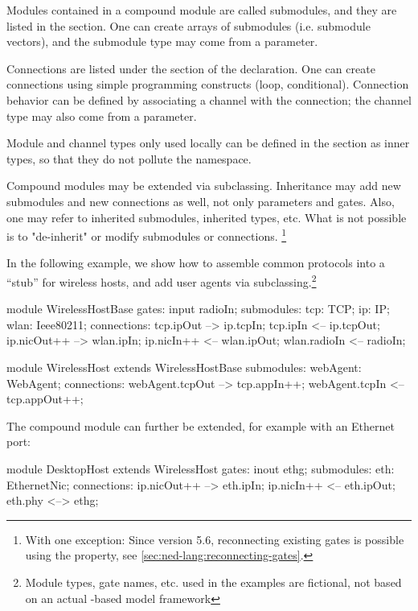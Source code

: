 Modules contained in a compound module are called submodules, and they are
listed in the  section. One can create arrays of submodules
(i.e. submodule vectors), and the submodule type may come from a parameter.

Connections are listed under the  section of the
declaration. One can create connections using simple programming constructs
(loop, conditional). Connection behavior can be defined by associating a
channel with the connection; the channel type may also come from a
parameter.

Module and channel types only used locally can be defined in the
 section as inner types, so that they do not pollute the
namespace.

Compound modules may be extended via subclassing. Inheritance may add new
submodules and new connections as well, not only parameters and gates.
Also, one may refer to inherited submodules, inherited types, etc. What
is not possible is to "de-inherit" or modify submodules or connections.
\footnote{With one exception: Since {\opp} version 5.6, reconnecting
existing gates is possible using the  property, see
\ref{sec:ned-lang:reconnecting-gates}.}

In the following example, we show how to assemble common protocols into a ``stub''
for wireless hosts, and add user agents via subclassing.\footnote{Module types,
gate names, etc. used in the examples are fictional, not based on an actual
{\opp}-based model framework}

\begin{ned}
module WirelessHostBase
{
   gates:
       input radioIn;
   submodules:
       tcp: TCP;
       ip: IP;
       wlan: Ieee80211;
   connections:
       tcp.ipOut --> ip.tcpIn;
       tcp.ipIn <-- ip.tcpOut;
       ip.nicOut++ --> wlan.ipIn;
       ip.nicIn++ <-- wlan.ipOut;
       wlan.radioIn <-- radioIn;
}

module WirelessHost extends WirelessHostBase
{
   submodules:
       webAgent: WebAgent;
   connections:
       webAgent.tcpOut --> tcp.appIn++;
       webAgent.tcpIn <-- tcp.appOut++;
}
\end{ned}

The  compound module can further be extended,
for example with an Ethernet port:

\begin{ned}
module DesktopHost extends WirelessHost
{
   gates:
       inout ethg;
   submodules:
       eth: EthernetNic;
   connections:
       ip.nicOut++ --> eth.ipIn;
       ip.nicIn++ <-- eth.ipOut;
       eth.phy <--> ethg;
}
\end{ned}



